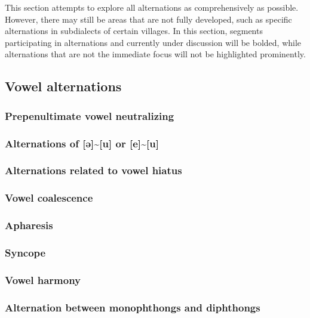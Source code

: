 This section attempts to explore all alternations as comprehensively as possible. However, there may still be areas that are not fully developed, such as specific alternations in subdialects of certain villages. In this section, segments participating in alternations and currently under discussion will be bolded, while alternations that are not the immediate focus will not be highlighted prominently. 

\subsection{Vowel alternations}

\subsubsection{Prepenultimate vowel neutralizing}
\lipsum[1-3]

\subsubsection{Alternations of [ə]\~{}[u] or [e]\~{}[u]}
\lipsum[1-3]

\subsubsection{Alternations related to vowel hiatus}
\lipsum[1-3]

\subsubsection{Vowel coalescence}
\lipsum[1-3]

\subsubsection{Apharesis} %
\lipsum[1-3]

\subsubsection{Syncope}
\lipsum[1-3]

\subsubsection{Vowel harmony}
\lipsum[1-3]

\subsubsection{Alternation between monophthongs and diphthongs}
\lipsum[1-3]

